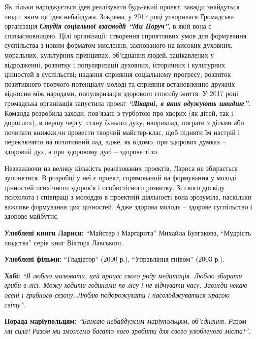 Як тільки народжується ідея реалізувати будь-який проект, завжди знайдуться
люди, яким ця ідея небайдужа. Зокрема, у 2017 році утворилася Громадська
організація \emph{\textbf{Студія соціальної взаємодії \enquote{Ми Поруч}}}, в якій вона є
співзасновницею. Цілі організації: створення сприятливих умов для формування
суспільства з новим форматом мислення, заснованого на високих духовних,
моральних, культурних принципах; об'єднання людей, зацікавлених у відродженні,
розвитку і популяризації духовних, історичних і культурних цінностей в
суспільстві; надання сприяння соціальному прогресу; розвиток позитивного
творчого потенціалу молоді та сприяння встановленню дружніх відносин між
народами, популяризація здорового способу життя. У 2017 році громадська
організація запустила проект \textbf{\emph{\enquote{Лікарні, в яких одужують швидше}}}. Команда
розробила заходи, пов'язані з турботою про хворих (як дітей, так і дорослих), в
першу чергу, стану їхнього духу, наприклад, пограти з дітьми або почитати
книжки,чи провести творчий майстер-клас, щоб підняти їм настрій і переключити
на позитивний лад, адже, як відомо, при здорових думках – здоровий дух, а при
здоровому дусі – здорове тіло.


Незважаючи на велику кількість реалізованих проектів, Лариса не збирається
зупинятися. В розробці у неї є проект, спрямований на формування у молоді
цінностей психічного здоров'я і особистісного розвитку. Зі свого досвіду
психолога і співпраці з молоддю в проектній діяльності вона зрозуміла,
наскільки важливе формування цих цінностей. Адже здорова молодь – здорове
суспільство і здорове майбутнє.

\textbf{Улюблені книги Лариси:} \enquote{Майстер і Маргарита} Михайла Булгакова, \enquote{Мудрість людства} серія книг Віктора Лавського.

\textbf{Улюблені фільми:} \enquote{Гладіатор} (2000 р.), \enquote{Управління гнівом} (2003 р.).

\textbf{Хобі:} \emph{\enquote{Я люблю малювати, цей процес свого роду медитація. Люблю збирати гриби в лісі. Можу ходити годинами по лісу і не відчувати часу. Завжди чекаю осені і грибного сезону. Люблю подорожувати і насолоджуватися красою світу}}.

\textbf{Порада маріупольцям:} \emph{\enquote{Бажаю небайдужим маріупольцям, об’єднання. Разом ми сила! Разом ми зможемо багато чого зробити для свого улюбленого міста!}}.

